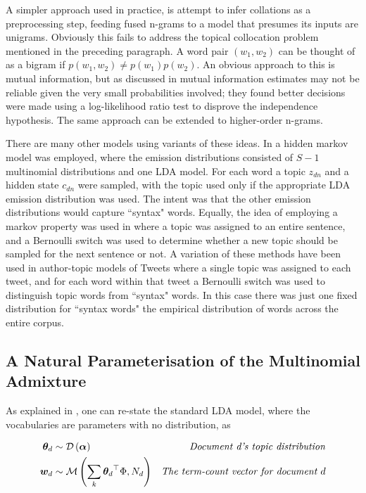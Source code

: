 A simpler approach used in practice, is attempt to infer collations as a preprocessing step, feeding fused n-grams to a model that presumes its inputs are unigrams. Obviously this fails to address the topical collocation problem mentioned in the preceding paragraph. A word pair $\left(w_1, w_2\right)$ can be thought of as a bigram if $p(w_1, w_2) \neq p(w_1)p(w_2)$. An obvious approach to this is mutual information, but as discussed in \cite{Dunning1993} mutual information estimates may not be reliable given the very small probabilities involved; they found better decisions were made using a log-likelihood ratio test to disprove the independence hypothesis. The same approach can be extended to higher-order n-grams.

There are many other models using variants of these ideas. In \cite{Griffiths2005} a hidden markov model was employed, where the emission distributions consisted of $S-1$ multinomial distributions and one LDA model. For each word a topic $z_{dn}$ and a hidden state $c_{dn}$ were sampled, with the topic used only if the appropriate LDA emission distribution was used. The intent was that the other emission distributions would capture ``syntax" words. Equally, the idea of employing a markov property was used in \cite{Gruber2007} where a topic was assigned to an entire sentence, and a Bernoulli switch was used to determine whether a new topic should be sampled for the next sentence or not. A variation of these methods have been used in author-topic models of Tweets\cite{Zhao2011}\cite{Zhao2011a} where a single topic was assigned to each tweet, and for each word within that tweet a Bernoulli switch was used to distinguish topic words from ``syntax" words. In this case there was just one fixed distribution for ``syntax words" the empirical distribution of words across the entire corpus.


\subsection*{A Natural Parameterisation of the Multinomial Admixture}
As explained in \cite{Buntine2002}, one can re-state the standard LDA model, where the vocabularies are parameters with no distribution, as

\begin{align}
{  \bm \theta _d } & \sim \mathcal{D} \left( {\bm \alpha} \right) & \text{\emph{Document d's topic distribution}} \\
\bm w_d & \sim \mathcal{M} \left( {\sum_k { \bm \theta_d }^\top\Phi},{N_d} \right) & \text{\emph{The term-count vector for document $d$}} \label{eqn:lda_convex_combo}
\end{align}


